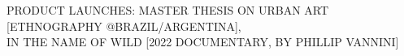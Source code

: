 \begin{cvtable}
{%
{\scriptsize PRODUCT LAUNCHES:
MASTER THESIS ON URBAN ART [ETHNOGRAPHY @BRAZIL/ARGENTINA], \\
IN THE NAME OF WILD [2022 DOCUMENTARY, BY PHILLIP VANNINI]
} \\
	\wt{%
	}
	}
\end{cvtable}

